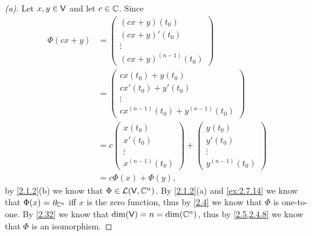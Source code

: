 \begin{proof}[(a)]
  Let \(x, y \in \mathsf{V}\) and let \(c \in \mathbb{C}\).
  Since
  \begin{align*}
    \Phi(cx + y) & = \begin{pmatrix}
                       (cx + y)(t_0)  \\
                       (cx + y)'(t_0) \\
                       \vdots         \\
                       (cx + y)^{(n - 1)}(t_0)
                     \end{pmatrix}              \\
                 & = \begin{pmatrix}
                       cx(t_0) + y(t_0)   \\
                       cx'(t_0) + y'(t_0) \\
                       \vdots             \\
                       cx^{(n - 1)}(t_0) + y^{(n - 1)}(t_0)
                     \end{pmatrix} \\
                 & = c \begin{pmatrix}
                         x(t_0)  \\
                         x'(t_0) \\
                         \vdots  \\
                         x^{(n - 1)}(t_0)
                       \end{pmatrix} + \begin{pmatrix}
                                         y(t_0)  \\
                                         y'(t_0) \\
                                         \vdots  \\
                                         y^{(n - 1)}(t_0)
                                       \end{pmatrix}   \\
                 & = c \Phi(x) + \Phi(y),
  \end{align*}
  by \cref{2.1.2}(b) we know that \(\Phi \in \mathcal{L}(\mathsf{V}, \mathbb{C}^n)\).
  By \cref{2.1.2}(a) and \cref{ex:2.7.14} we know that \(\Phi(x) = \mathit{0}_{\mathbb{C}^n}\) iff \(x\) is the zero function, thus by \cref{2.4} we know that \(\Phi\) is one-to-one.
  By \cref{2.32} we know that \(\dim(\mathsf{V}) = n = \dim(\mathbb{C}^n)\), thus by \cref{2.5,2.4.8} we know that \(\Phi\) is an isomorphism.
\end{proof}

